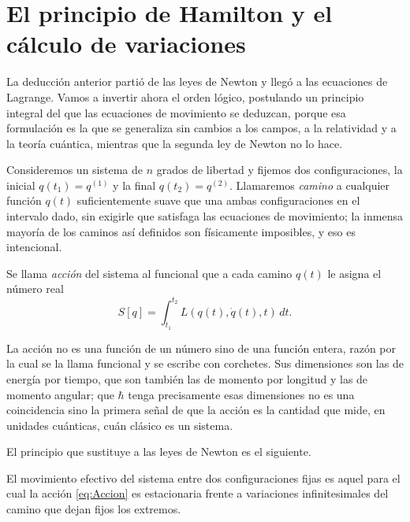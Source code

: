 \section{El principio de Hamilton y el cálculo de variaciones}

        La deducción anterior partió de las leyes de Newton y llegó a las ecuaciones de Lagrange. Vamos a invertir ahora el orden lógico, postulando un principio integral del que las ecuaciones de movimiento se deduzcan, porque esa formulación es la que se generaliza sin cambios a los campos, a la relatividad y a la teoría cuántica, mientras que la segunda ley de Newton no lo hace.

        Consideremos un sistema de $n$ grados de libertad y fijemos dos configuraciones, la inicial $q(t_{1}) = q^{(1)}$ y la final $q(t_{2}) = q^{(2)}$. Llamaremos \textit{camino} a cualquier función $q(t)$ suficientemente suave que una ambas configuraciones en el intervalo dado, sin exigirle que satisfaga las ecuaciones de movimiento; la inmensa mayoría de los caminos así definidos son físicamente imposibles, y eso es intencional.

        \begin{myDef}\label{def:Accion}
            Se llama \textit{acción} del sistema al funcional que a cada camino $q(t)$ le asigna el número real
            \begin{equation}\label{eq:Accion}
                S[q] = \int_{t_{1}}^{t_{2}} L\left(q(t),\dot{q}(t),t\right)\,dt .
            \end{equation}
        \end{myDef}

        La acción no es una función de un número sino de una función entera, razón por la cual se la llama funcional y se escribe con corchetes. Sus dimensiones son las de energía por tiempo, que son también las de momento por longitud y las de momento angular; que $\hbar$ tenga precisamente esas dimensiones no es una coincidencia sino la primera señal de que la acción es la cantidad que mide, en unidades cuánticas, cuán clásico es un sistema.

        El principio que sustituye a las leyes de Newton es el siguiente.

        \begin{Assumption}\label{sup:Hamilton}
            El movimiento efectivo del sistema entre dos configuraciones fijas es aquel para el cual la acción \eqref{eq:Accion} es estacionaria frente a variaciones infinitesimales del camino que dejan fijos los extremos.
        \end{Assumption}

